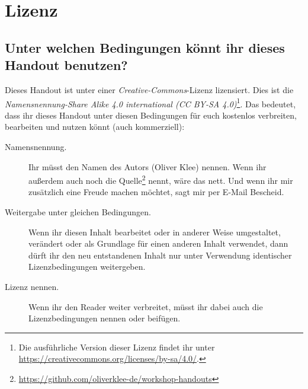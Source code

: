 \chapter{Lizenz}
\label{lizenz}


\section*{Unter welchen Bedingungen könnt ihr dieses Handout benutzen?}
Dieses Handout ist unter einer \emph{Creative-Commons}-Lizenz lizensiert. Dies ist die \emph{Namensnennung-Share Alike 4.0 international (CC BY-SA 4.0)}\footnote{Die ausführliche Version dieser Lizenz findet ihr unter \url{https://creativecommons.org/licenses/by-sa/4.0/}.}. Das bedeutet, dass ihr dieses Handout unter diesen Bedingungen für euch kostenlos verbreiten, bearbeiten und nutzen könnt (auch kommerziell):

\begin{description}
    \item[Namensnennung.] Ihr müsst den Namen des Autors (Oliver Klee) nennen. Wenn ihr außerdem auch noch die Quelle\footnote{\url{https://github.com/oliverklee-de/workshop-handouts}} nennt, wäre das nett. Und wenn ihr mir zusätzlich eine Freude machen möchtet, sagt mir per E-Mail Bescheid.
    \item[Weitergabe unter gleichen Bedingungen.] Wenn ihr diesen Inhalt bearbeitet oder in anderer Weise umgestaltet, verändert oder als Grundlage für einen anderen Inhalt verwendet, dann dürft ihr den neu entstandenen Inhalt nur unter Verwendung identischer Lizenzbedingungen weitergeben.
    \item[Lizenz nennen.] Wenn ihr den Reader weiter verbreitet, müsst ihr dabei auch die Lizenzbedingungen nennen oder beifügen.
\end{description}
